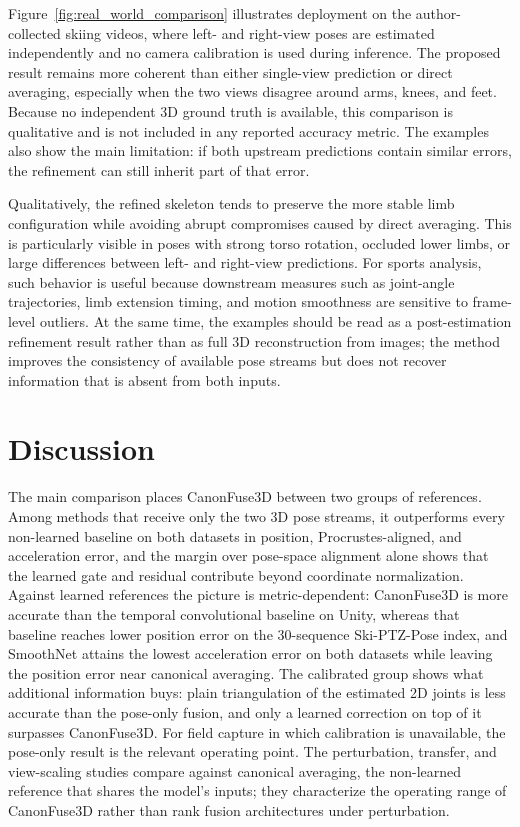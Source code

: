 \documentclass[preprint,12pt]{elsarticle}
\begin{document}
Figure~\ref{fig:real_world_comparison} illustrates deployment on the author-collected skiing videos, where left- and right-view poses are estimated independently and no camera calibration is used during inference. The proposed result remains more coherent than either single-view prediction or direct averaging, especially when the two views disagree around arms, knees, and feet. Because no independent 3D ground truth is available, this comparison is qualitative and is not included in any reported accuracy metric. The examples also show the main limitation: if both upstream predictions contain similar errors, the refinement can still inherit part of that error.

Qualitatively, the refined skeleton tends to preserve the more stable limb configuration while avoiding abrupt compromises caused by direct averaging. This is particularly visible in poses with strong torso rotation, occluded lower limbs, or large differences between left- and right-view predictions. For sports analysis, such behavior is useful because downstream measures such as joint-angle trajectories, limb extension timing, and motion smoothness are sensitive to frame-level outliers. At the same time, the examples should be read as a post-estimation refinement result rather than as full 3D reconstruction from images; the method improves the consistency of available pose streams but does not recover information that is absent from both inputs.

\FloatBarrier
\section{Discussion}
\label{sec:discussion}

The main comparison places CanonFuse3D between two groups of references. Among methods that receive only the two 3D pose streams, it outperforms every non-learned baseline on both datasets in position, Procrustes-aligned, and acceleration error, and the margin over pose-space alignment alone shows that the learned gate and residual contribute beyond coordinate normalization. Against learned references the picture is metric-dependent: CanonFuse3D is more accurate than the temporal convolutional baseline on Unity, whereas that baseline reaches lower position error on the 30-sequence Ski-PTZ-Pose index, and SmoothNet attains the lowest acceleration error on both datasets while leaving the position error near canonical averaging. The calibrated group shows what additional information buys: plain triangulation of the estimated 2D joints is less accurate than the pose-only fusion, and only a learned correction on top of it surpasses CanonFuse3D. For field capture in which calibration is unavailable, the pose-only result is the relevant operating point. The perturbation, transfer, and view-scaling studies compare against canonical averaging, the non-learned reference that shares the model's inputs; they characterize the operating range of CanonFuse3D rather than rank fusion architectures under perturbation.
\end{document}
